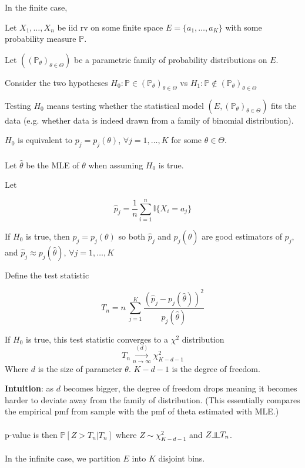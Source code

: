 \documentclass{article}
\newcommand{\indep}{\rotatebox[origin=c]{90}{$\models$}}
\begin{document}
In the finite case,

Let $X_1, \dots, X_n$ be iid rv on some finite space $E = \{a_1, \dots, a_K\}$ with some probability measure $\mathbb{P}$.

Let $(\mathbb{(P_{\theta})}_{\theta \in \Theta})$ be a parametric family of probability distributions on $E$.

Consider the two hypotheses $H_0: \mathbb{P} \in (\mathbb{P}_{\theta})_{\theta \in \Theta}$ vs $H_1: \mathbb{P} \notin (\mathbb{P}_{\theta})_{\theta \in \Theta}$

Testing $H_0$ means testing whether the statistical model $(E, (\mathbb{P_{\theta}})_{\theta \in \Theta})$ fits the data (e.g. whether data is indeed drawn from a family of binomial distribution).

$H_0$ is equivalent to $p_j = p_j(\theta)$, $\forall j = 1, \dots, K$ for some $\theta \in \Theta$.
\\
\\
Let $\hat{\theta}$ be the MLE of $\theta$ when assuming $H_0$ is true.

Let

$$
\hat{p}_j = \frac{1}{n} \sum_{i = 1}^{n}\mathbb{I}\{X_i = a_j\}
$$

If $H_0$ is true, then $p_j = p_j(\theta)$ so both $\hat{p}_j$ and $p_j(\hat{\theta})$ are good estimators of $p_j$,
and $\hat{p}_j \approx p_j(\hat{\theta})$, $\forall j = 1, \dots, K$

Define the test statistic

$$
T_n = n ~ \sum_{j = 1}^{K} \frac{(\hat{p}_j - p_j(\hat{\theta}))^2}{p_j(\hat{\theta})}
$$

If $H_0$ is true, this test statistic converges to a $\chi^2$ distribution
$$
T_n \overset{(d)}{\underset{n \to \infty}{\longrightarrow}} \chi^2_{K - d - 1}
$$
Where $d$ is the size of parameter $\theta$. $K - d - 1$ is the degree of freedom.

\textbf{Intuition}: as $d$ becomes bigger, the degree of freedom drops meaning it becomes harder to deviate away from the family of distribution.
(This essentially compares the empirical pmf from sample with the pmf of theta estimated with MLE.)
\\
\\
p-value is then $\mathbb{P}[Z > T_n | T_n]$ where $Z \sim \chi^2_{K - d - 1}$ and $Z \indep T_n$.
\\
\\

In the infinite case, we partition $E$ into $K$ disjoint bins.
\end{document}
